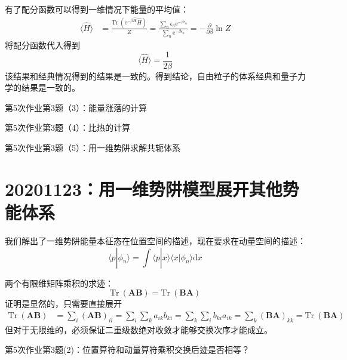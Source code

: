         有了配分函数可以得到一维情况下能量的平均值：
        \begin{align*}
            \langle \hat{H} \rangle &= \frac {\mathrm{Tr} \ (\mathrm{e}^{-\beta \hat{H}} \hat{H})}Z
            = \frac {\sum_n \epsilon_n \mathrm{e}^{-\beta \epsilon_n}}{\sum_n \mathrm{e}^{-\beta \epsilon_n}}
            = -\frac {\partial}{\partial \beta} \ln{Z}
        \end{align*}
        将配分函数代入得到
        \[ \langle \hat{H} \rangle = \frac 1{2\beta} \]
        该结果和经典情况得到的结果是一致的。得到结论，自由粒子的体系经典和量子力学的结果是一致的。
        \begin{asg}
            第5次作业第3题（3）：能量涨落的计算
        \end{asg}
        \begin{asg}
            第5次作业第3题（4）：比热的计算
        \end{asg}
        \begin{asg}
            第5次作业第3题（5）：用一维势阱求解共轭体系
        \end{asg}

    \section{20201123：用一维势阱模型展开其他势能体系}
        我们解出了一维势阱能量本征态在位置空间的描述，现在要求在动量空间的描述：
        \[ \langle p|\phi_n \rangle = \int \langle p|x \rangle \langle x |\phi_n \rangle \mathrm{d}x \]

        两个有限维矩阵乘积的求迹：
        \begin{equation*}
            \mathrm{Tr} \ (\bm{AB}) = \mathrm{Tr} \ (\bm{BA})
        \end{equation*}
        证明是显然的，只需要直接展开
        \begin{align*}
            \mathrm{Tr} \ (\bm{AB}) &= \sum_i (\bm{AB})_{ii}
            = \sum_i \sum_k a_{ik}b_{ki}
            = \sum_k \sum_i b_{ki}a_{ik}
            = \sum_k \bm{(BA)}_{kk}
            = \mathrm{Tr} \ (\bm{BA})
        \end{align*}
        但对于无限维的，必须保证二重级数绝对收敛才能够交换次序才能成立。
        \begin{asg}
            第5次作业第3题(2)：位置算符和动量算符乘积交换后迹是否相等？
        \end{asg}


